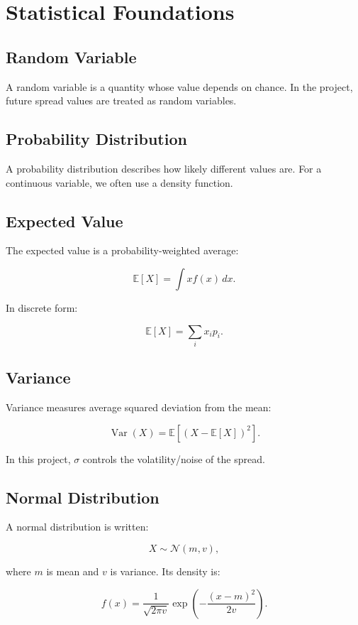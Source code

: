 \documentclass[11pt]{article}
\newcommand{\E}{\mathbb{E}}
\newcommand{\Var}{\operatorname{Var}}
\newcommand{\Normal}{\mathcal{N}}
\begin{document}
\section{Statistical Foundations}

\subsection{Random Variable}

A random variable is a quantity whose value depends on chance. In the project,
future spread values are treated as random variables.

\subsection{Probability Distribution}

A probability distribution describes how likely different values are. For a
continuous variable, we often use a density function.

\subsection{Expected Value}

The expected value is a probability-weighted average:

\[
\E[X] = \int x f(x)\,dx.
\]

In discrete form:

\[
\E[X] = \sum_i x_i p_i.
\]

\subsection{Variance}

Variance measures average squared deviation from the mean:

\[
\Var(X) = \E[(X - \E[X])^2].
\]

In this project, $\sigma$ controls the volatility/noise of the spread.

\subsection{Normal Distribution}

A normal distribution is written:

\[
X \sim \Normal(m, v),
\]

where $m$ is mean and $v$ is variance. Its density is:

\[
f(x) = \frac{1}{\sqrt{2\pi v}}
\exp\left(-\frac{(x-m)^2}{2v}\right).
\]
\end{document}
